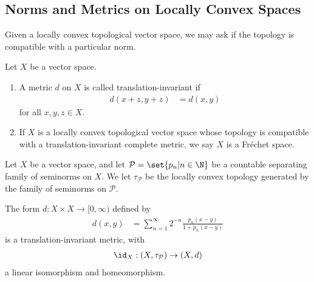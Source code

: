 \documentclass[10pt]{mypackage}
\begin{document}
\subsection{Norms and Metrics on Locally Convex Spaces}%
Given a locally convex topological vector space, we may ask if the topology is compatible with a particular norm.
\begin{definition}
  Let $X$ be a vector space.
  \begin{enumerate}[(1)]
    \item A metric $d$ on $X$ is called translation-invariant if
      \begin{align*}
        d\left(x + z,y+z\right) &= d\left(x,y\right)
      \end{align*}
      for all $x,y,z\in X$.
    \item If $X$ is a locally convex topological vector space whose topology is compatible with a translation-invariant complete metric, we say $X$ is a Fréchet space.
  \end{enumerate}
\end{definition}
\begin{proposition}
  Let $X$ be a vector space, and let $\mathcal{P} = \set{p_n | n\in \N}$ be a countable separating family of seminorms on $X$. We let $\tau_{\mathcal{P}}$ be the locally convex topology generated by the family of seminorms on $\mathcal{P}$.\newline

  The form $d: X\times X\rightarrow [0,\infty)$ defined by
  \begin{align*}
    d\left(x,y\right) &= \sum_{n=1}^{\infty}2^{-n}\frac{p_n\left(x-y\right)}{1 + p_n\left(x-y\right)}
  \end{align*}
  is a translation-invariant metric, with
  \begin{align*}
    \id_{X}: \left(X,\tau_{\mathcal{P}}\right) \rightarrow \left(X,d\right)
  \end{align*}
  a linear isomorphism and homeomorphism.
\end{proposition}
\end{document}
